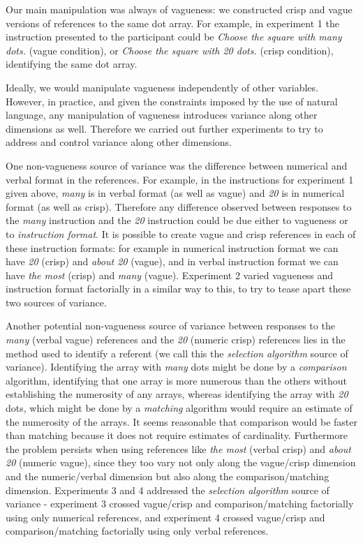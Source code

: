Our main manipulation was always of vagueness: we constructed crisp and vague versions of references to the same dot array. For example, in experiment 1 the instruction presented to the participant could be \emph{Choose the square with many dots.} (vague condition), or \emph{Choose the square with 20 dots.} (crisp condition), identifying the same dot array.

Ideally, we would manipulate vagueness independently of other variables. However, in practice, and given the constraints imposed by the use of natural language, any manipulation of vagueness introduces variance along other dimensions as well. Therefore we carried out further experiments to try to address and control variance along other dimensions. 

One non-vagueness source of variance was the difference between numerical and verbal format in the references. For example, in the instructions for experiment 1 given above, \emph{many} is in verbal format (as well as vague) and \emph{20} is in numerical format (as well as crisp). Therefore any difference observed between responses to the \emph{many} instruction and the \emph{20} instruction could be due either to vagueness or to {\sl instruction format}. It is possible to create vague and crisp references in each of these instruction formats: for example in numerical instruction format we can have \emph{20} (crisp) and \emph{about 20} (vague), and in verbal instruction format we can have \emph{the most} (crisp) and \emph{many} (vague). Experiment 2 varied vagueness and instruction format factorially in a similar way to this, to try to tease apart these two sources of variance.

Another potential non-vagueness source of variance between responses to the \emph{many} (verbal vague) references and the \emph{20} (numeric crisp) references lies in the method used to identify a referent (we call this the {\sl selection algorithm} source of variance). Identifying the array with \emph{many} dots might be done by a \emph{comparison} algorithm, identifying that one array is more numerous than the others without establishing the numerosity of any arrays, whereas identifying the array with \emph{20} dots, which might be done by a \emph{matching} algorithm would require an estimate of the numerosity of the arrays. It seems reasonable that comparison would be faster than matching because it does not require estimates of cardinality. Furthermore the problem persists when using references like \emph{the most} (verbal crisp) and \emph{about 20} (numeric vague), since they too vary not only along the vague/crisp dimension and the numeric/verbal dimension but also along the comparison/matching dimension. Experiments 3 and 4 addressed the \emph{selection algorithm} source of variance - experiment 3 crossed vague/crisp and comparison/matching factorially using only numerical references, and experiment 4 crossed vague/crisp and comparison/matching factorially using only verbal references.  

